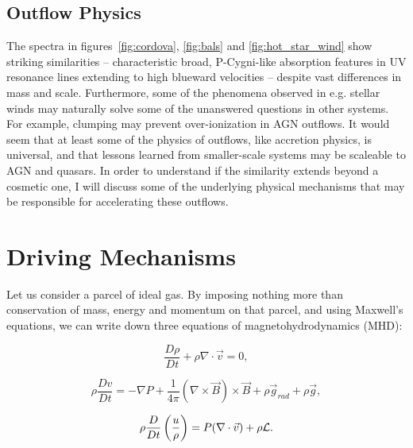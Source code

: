 \subsection{Outflow Physics}

The spectra in figures~\ref{fig:cordova}, \ref{fig:bals}
and \ref{fig:hot_star_wind} show striking similarities -- 
characteristic broad, P-Cygni-like absorption features in UV resonance
lines extending to high blueward velocities -- 
despite vast differences in mass and scale. 
Furthermore, some of the phenomena observed in e.g. stellar winds may 
naturally solve some of 
the unanswered questions in other systems. For example, clumping
may prevent over-ionization in AGN outflows. It would seem
that at least some of the physics of outflows, like accretion physics,
is universal, and that lessons learned from smaller-scale systems may be
scaleable to AGN and quasars. In order to understand if the similarity extends beyond
a cosmetic one, I will discuss some of the 
underlying physical mechanisms that may be responsible for accelerating
these outflows.

\section{Driving Mechanisms}

Let us consider a parcel of ideal gas. By imposing nothing more than
conservation of mass, energy and momentum on that parcel, and using 
Maxwell's equations, we can write down 
three equations of magnetohydrodynamics (MHD):

\begin{equation}
\label{eq:continuity}
\frac{D \rho}{Dt} + \rho \nabla \cdot \vec{v} = 0,
\end{equation}

\begin{equation}
\label{eq:motion}
\rho \frac{Dv}{Dt} = -\nabla P + \frac{1}{4 \pi}(\nabla \times \vec{B}) \times \vec{B} + \rho \vec{g}_{rad} + \rho \vec{g},
\end{equation}

\begin{equation}
\label{eq:energy}
\rho \frac{D}{Dt} \left(\frac{u}{\rho}\right) = P (\nabla \cdot \vec{v}) + \rho \cal{L}.
\end{equation}

